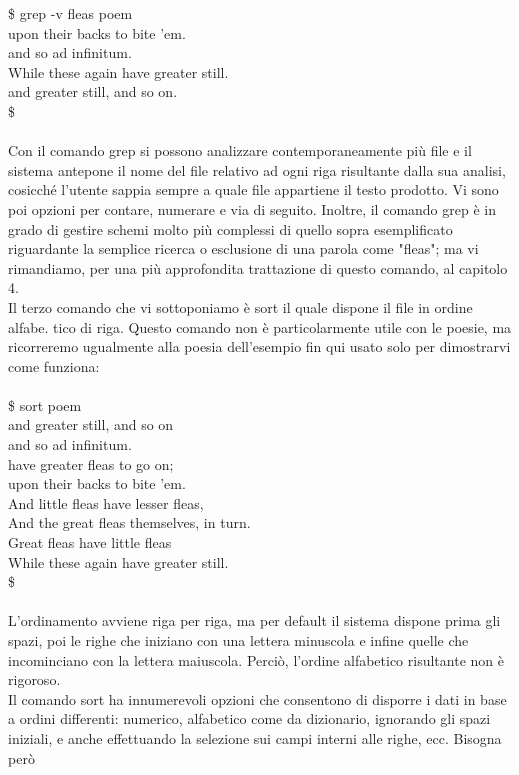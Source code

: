 \$ grep -v fleas poem\\
upon their backs to bite 'em.\\
and so ad infinitum.\\
While these again have greater still.\\
and greater still, and so on.\\
\$\\\\
Con il comando grep si possono analizzare contemporaneamente più file e il sistema
antepone il nome del file relativo ad ogni riga risultante dalla sua analisi, cosicché
l'utente sappia sempre a quale file appartiene il testo prodotto. Vi sono poi opzioni
per contare, numerare e via di seguito. Inoltre, il comando grep è in grado di gestire
schemi molto più complessi di quello sopra esemplificato riguardante la semplice 
ricerca o esclusione di una parola come "fleas"; ma vi rimandiamo, per una più 
approfondita trattazione di questo comando, al capitolo 4.\\
Il terzo comando che vi sottoponiamo è sort il quale dispone il file in ordine alfabe.
tico di riga. Questo comando non è particolarmente utile con le poesie, ma ricorreremo
ugualmente alla poesia dell'esempio fin qui usato solo per dimostrarvi come funziona:\\\\
\$ sort poem\\
and greater still, and so on\\
and so ad infinitum.\\
have greater fleas to go on;\\
upon their backs to bite 'em.\\
And little fleas have lesser fleas,\\
And the great fleas themselves, in turn.\\
Great fleas have little fleas\\
While these again have greater still.\\
\$\\\\
L'ordinamento avviene riga per riga, ma per default il sistema dispone prima gli spazi, 
poi le righe che iniziano con una lettera minuscola e infine quelle che incominciano 
con la lettera maiuscola. Perciò, l'ordine alfabetico risultante non è rigoroso.\\
Il comando sort ha innumerevoli opzioni che consentono di disporre i dati in base a
ordini differenti: numerico, alfabetico come da dizionario, ignorando gli spazi iniziali, 
e anche effettuando la selezione sui campi interni alle righe, ecc. Bisogna però 
